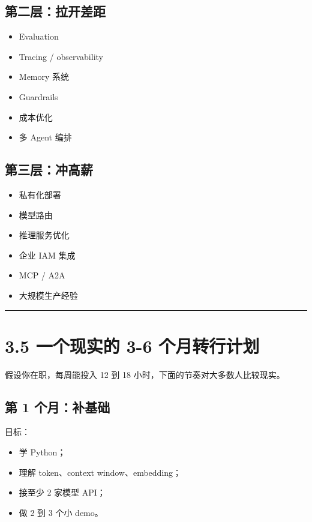 \subsection{第二层：拉开差距}

\begin{itemize}[leftmargin=2em]
\item Evaluation
\item Tracing / observability
\item Memory 系统
\item Guardrails
\item 成本优化
\item 多 Agent 编排
\end{itemize}

\subsection{第三层：冲高薪}

\begin{itemize}[leftmargin=2em]
\item 私有化部署
\item 模型路由
\item 推理服务优化
\item 企业 IAM 集成
\item MCP / A2A
\item 大规模生产经验
\end{itemize}

\bigskip\hrule\bigskip

\section{3.5 一个现实的 3-6 个月转行计划}

假设你在职，每周能投入 12 到 18 小时，下面的节奏对大多数人比较现实。


\subsection{第 1 个月：补基础}

目标：


\begin{itemize}[leftmargin=2em]
\item 学 Python；
\item 理解 token、context window、embedding；
\item 接至少 2 家模型 API；
\item 做 2 到 3 个小 demo。
\end{itemize}

